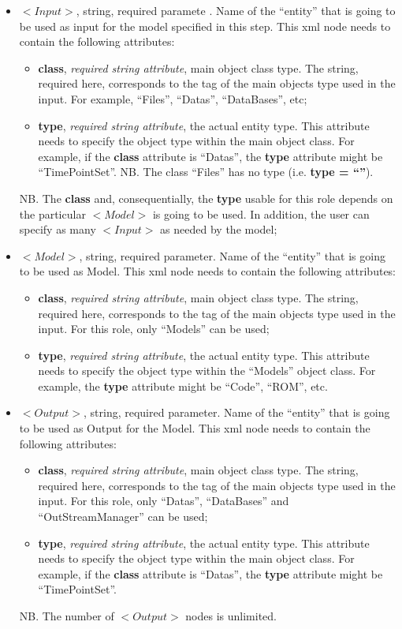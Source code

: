 \begin{itemize}
\item $<Input>$, string, required paramete . Name of the ``entity'' that is going to be used as input for the model specified in this step. This xml node needs to contain the following attributes:
\begin{itemize}
  \item \textbf{class}, \textit{required string attribute}, main object class type. The string, required here, corresponds to the tag of the main objects type used in the input. For example, ``Files'', ``Datas'', ``DataBases'', etc;
  \item \textbf{type}, \textit{required string attribute}, the actual entity type. This attribute needs to specify the object type within the main object class. For example, if the  \textbf{class} attribute is ``Datas'', the \textbf{type} attribute might be ``TimePointSet''. NB. The class ``Files'' has no type (i.e. \textbf{type = ``''}).
\end{itemize}
NB. The \textbf{class} and, consequentially,  the \textbf{type} usable for this role depends on the particular $<Model>$ is going to be used. In addition, the user can specify as many $<Input>$ as needed by the model;
\item $<Model>$, string, required parameter. Name of the ``entity'' that is going to be used as Model. This xml node needs to contain the following attributes:
\begin{itemize}
  \item \textbf{class}, \textit{required string attribute}, main object class type. The string, required here, corresponds to the tag of the main objects type used in the input. For this role, only ``Models'' can be used;
  \item \textbf{type}, \textit{required string attribute}, the actual entity type. This attribute needs to specify the object type within the ``Models'' object class. For example, the \textbf{type} attribute might be ``Code'', ``ROM'', etc.
\end{itemize}
\item $<Output>$, string, required parameter. Name of the ``entity'' that is going to be used as Output for the Model. This xml node needs to contain the following attributes:
\begin{itemize}
  \item \textbf{class}, \textit{required string attribute}, main object class type. The string, required here, corresponds to the tag of the main objects type used in the input. For this role, only ``Datas'', ``DataBases'' and ``OutStreamManager'' can be used;
  \item \textbf{type}, \textit{required string attribute}, the actual entity type. This attribute needs to specify the object type within the main object class. For example, if the  \textbf{class} attribute is ``Datas'', the \textbf{type} attribute might be ``TimePointSet''.
\end{itemize}
NB. The number of $<Output>$ nodes is unlimited.
\end{itemize}

